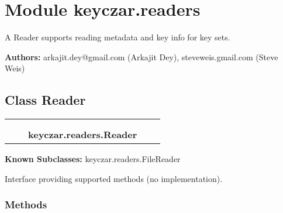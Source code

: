 %
%
%


\section{Module keyczar.readers}

    \label{keyczar:readers}
A Reader supports reading metadata and key info for key sets.

\textbf{Authors:}
arkajit.dey@gmail.com (Arkajit Dey),
    steveweis.gmail.com (Steve Weis)



\subsection{Class Reader}

    \label{keyczar:readers:Reader}
\begin{tabular}{cccccc}
\multicolumn{2}{r}{\settowidth{\BCL}{object}\multirow{2}{\BCL}{object}}
&&
  \\\cline{3-3}
  &&\multicolumn{1}{c|}{}
&&
  \\
&&\multicolumn{2}{l}{\textbf{keyczar.readers.Reader}}
\end{tabular}

\textbf{Known Subclasses:} keyczar.readers.FileReader

Interface providing supported methods (no implementation).



  \subsubsection{Methods}

